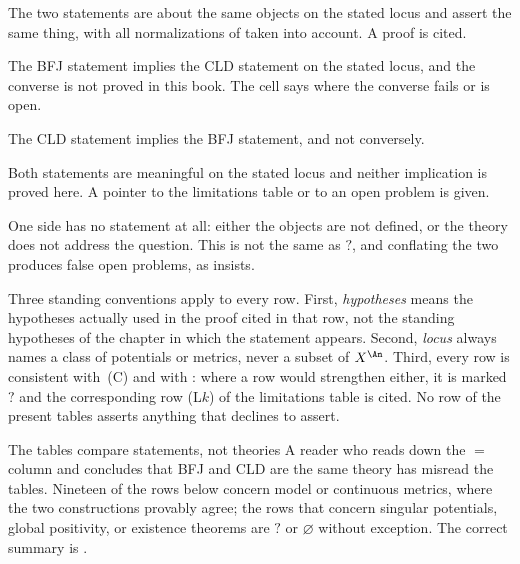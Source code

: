 \begin{description}[style=nextline,leftmargin=0pt,labelindent=0pt,
  labelsep=0pt,itemsep=.3\baselineskip,font=\normalfont\bfseries]
\item[\(=\) equality]
The two statements are about the same objects on the stated locus and assert
the same thing, with all normalizations of  taken
into account.  A proof is cited.
\item[\(\Rightarrow\) one-way implication]
The BFJ statement implies the CLD statement on the stated locus, and the
converse is not proved in this book.  The cell says where the converse
fails or is open.
\item[\(\Leftarrow\) one-way implication]
The CLD statement implies the BFJ statement, and not conversely.
\item[\(?\) unknown]
Both statements are meaningful on the stated locus and neither implication
is proved here.  A pointer to the limitations table or to an open problem is
given.
\item[\(\varnothing\) no counterpart]
One side has no statement at all: either the objects are not defined, or the
theory does not address the question.  This is not the same as \(?\), and
conflating the two produces false open problems, as
 insists.
\end{description}

Three standing conventions apply to every row.  First, \emph{hypotheses}
means the hypotheses actually used in the proof cited in that row, not the
standing hypotheses of the chapter in which the statement appears.  Second,
\emph{locus} always names a class of potentials or metrics, never a subset
of \(X^{\An}\).  Third, every row is consistent with
\,(C) and with
: where a row would strengthen either, it
is marked \(?\) and the corresponding row \textup{(L\(k\))} of the
limitations table is cited.  No row of the present tables asserts anything
that  declines to assert.

\begin{warning}{The tables compare statements, not theories}
A reader who reads down the \(=\) column and concludes that BFJ and CLD are
the same theory has misread the tables.  Nineteen of the rows below concern
model or continuous metrics, where the two constructions provably agree; the
rows that concern singular potentials, global positivity, or existence
theorems are \(?\) or \(\varnothing\) without exception.  The correct summary
is .
\end{warning}

